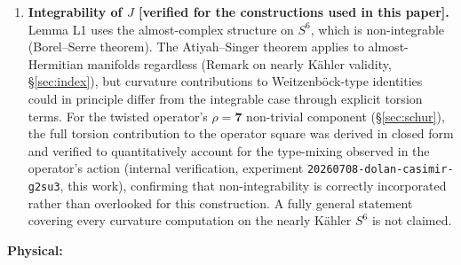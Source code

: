 \documentclass[12pt,a4paper]{article}
\begin{document}
\begin{enumerate}
  dimensions exactly $(2,1)$ with no missed invariants); and a closed-form analytic
  derivation identifying the amplitude as the Killing-spinor Dirac eigenvalue $-\sqrt{3}$
  with the twisting correction vanishing by representation theory (no $\mathrm{SU}(3)$
  singlet in $\mathbf{3}\otimes\mathbf{3}$). We report it as an internally certified
  result; external review remains outstanding. See experiment
  \texttt{20260708-dolan-casimir-g2su3} (trivial-component rank computed; non-trivial-component
  torsion correction directly verified for $\rho=\mathbf{7},\mathbf{14}$), experiments
  \texttt{20260713-round52-growing-gap-premise-audit} through
  \texttt{20260713-round56-exceptional-set-registration} (a certified general bound now closes
  every remaining nontrivial representation; see \S\ref{sec:schur} for the full statement),
  and experiment \texttt{20260714-round59-trivial-rank-certification} (the three-route
  certification of the trivial-component rank).
  The representation-theoretic setup builds on~\cite{AgrHofLawn2023,Agricola2002}.

\item \textbf{Integrability of $J$ [verified for the constructions used in this paper].}
  Lemma L1 uses the almost-complex structure on $S^6$, which is non-integrable
  (Borel--Serre theorem). The Atiyah--Singer theorem applies to almost-Hermitian manifolds
  regardless (Remark on nearly K\"ahler validity, \S\ref{sec:index}), but curvature
  contributions to Weitzenb\"ock-type identities could in principle differ from the
  integrable case through explicit torsion terms. For the twisted operator's
  $\rho=\mathbf{7}$ non-trivial component (\S\ref{sec:schur}), the full torsion
  contribution to the operator square was derived in closed form and verified to
  quantitatively account for the type-mixing observed in the operator's action
  (internal verification, experiment \texttt{20260708-dolan-casimir-g2su3}, this work),
  confirming that non-integrability is correctly incorporated rather than overlooked for
  this construction. A fully general statement covering every curvature computation on
  the nearly K\"ahler $S^6$ is not claimed.

\end{enumerate}

\textbf{Physical:}
\end{document}
